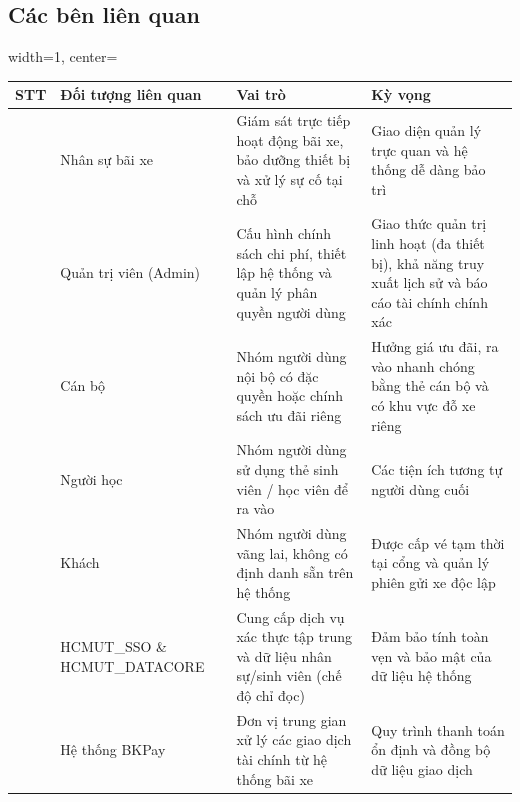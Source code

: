 \subsection{Các bên liên quan}
\begin{adjustbox}{width=1\textwidth, center=\textwidth}
    \small
    \begin{tabular}{|>{\centering\arraybackslash}m{1cm}|>{\centering\arraybackslash}m{4cm}|>{\centering\arraybackslash}m{5.9cm}|>{\centering\arraybackslash}m{5.7cm}|}
    \hline
    \textbf{STT} & \textbf{Đối tượng liên quan} & \textbf{Vai trò} & \textbf{Kỳ vọng} \\ \hline
    1 & Nhân sự bãi xe & Giám sát trực tiếp hoạt động bãi xe, bảo dưỡng thiết bị và xử lý sự cố tại chỗ & Giao diện quản lý trực quan và hệ thống dễ dàng bảo trì \\ \hline
    2 & Quản trị viên (Admin) & Cấu hình chính sách chi phí, thiết lập hệ thống và quản lý phân quyền người dùng & Giao thức quản trị linh hoạt (đa thiết bị), khả năng truy xuất lịch sử và báo cáo tài chính chính xác \\ \hline
    3 & Cán bộ & Nhóm người dùng nội bộ có đặc quyền hoặc chính sách ưu đãi riêng & Hưởng giá ưu đãi, ra vào nhanh chóng bằng thẻ cán bộ và có khu vực đỗ xe riêng \\ \hline
    4 & Người học & Nhóm người dùng sử dụng thẻ sinh viên / học viên để ra vào & Các tiện ích tương tự người dùng cuối\\ \hline
    5 & Khách & Nhóm người dùng vãng lai, không có định danh sẵn trên hệ thống & Được cấp vé tạm thời tại cổng và quản lý phiên gửi xe độc lập \\ \hline
    6 & HCMUT\_SSO \& HCMUT\_DATACORE & Cung cấp dịch vụ xác thực tập trung và dữ liệu nhân sự/sinh viên (chế độ chỉ đọc) & Đảm bảo tính toàn vẹn và bảo mật của dữ liệu hệ thống \\ \hline
    7 & Hệ thống BKPay & Đơn vị trung gian xử lý các giao dịch tài chính từ hệ thống bãi xe & Quy trình thanh toán ổn định và đồng bộ dữ liệu giao dịch \\ \hline
    \end{tabular}
\end{adjustbox}